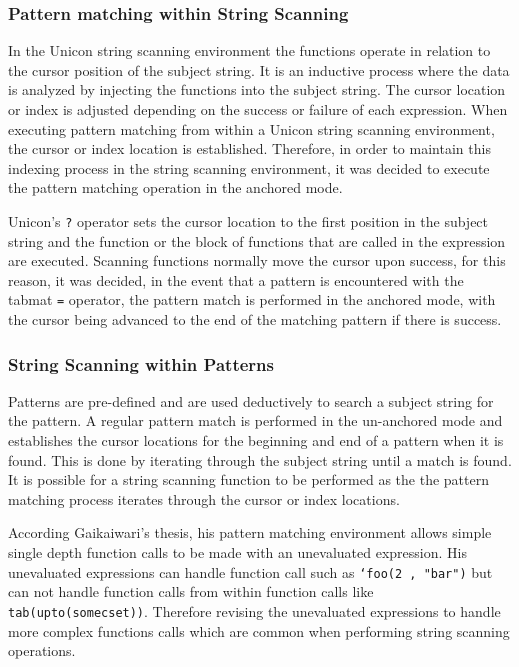 \documentclass{article}
\begin{document}
\subsubsection{Pattern matching within String Scanning}
In the Unicon string scanning environment the functions operate in relation to the cursor position of the subject string.  It is an inductive process where the data is analyzed by injecting the functions into the subject string.  The cursor location or index is adjusted depending on the success or failure of each expression.  When executing pattern matching from within a Unicon string scanning environment, the cursor or index location is established.  Therefore, in order to maintain this indexing process in the string scanning environment, it was decided to execute the pattern matching operation in the anchored mode.  

Unicon's \texttt{?} operator sets the cursor location to the first position in the subject string and the function or the block of functions that are called in the expression are executed.  Scanning functions normally move the cursor upon success, for this reason, it was decided, in the event that a pattern is encountered with the tabmat \texttt{=} operator, the pattern match is performed in the anchored mode, with the cursor being advanced to the end of the matching pattern if there is success.

\subsubsection{String Scanning within Patterns}
Patterns are pre-defined and are used deductively to search a subject string for the pattern.  A regular pattern match is performed in the un-anchored mode and establishes the cursor locations for the beginning and end of a pattern when it is found.  This is done by iterating through the subject string until a match is found.  It is possible for a string scanning function to be performed as the the pattern matching process iterates through the cursor or index locations.

According Gaikaiwari's thesis, his pattern matching environment allows simple single depth function calls to be made with an unevaluated expression.  His unevaluated expressions can handle function call such as \texttt{`foo(2 , "bar")} but can not handle function calls from within function calls like \texttt{tab(upto(somecset))}.\cite{Gaikaiwari2005}  Therefore revising the unevaluated expressions to handle more complex functions calls which are common when performing string scanning operations.
\end{document}
